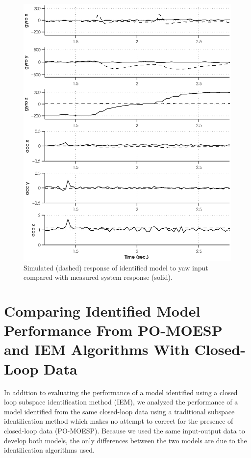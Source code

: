 \newpage
\begin{figure}[htb!]
	\centering
	\includegraphics{../fig/sim_1760_yaw.eps}
	\caption{Simulated (dashed) response of identified model to yaw input compared with measured system response (solid).}
	\label{sim_1760_yaw}
\end{figure}\clearpage


\newpage
\section{Comparing Identified Model Performance From PO-MOESP and IEM Algorithms With Closed-Loop Data}
In addition to evaluating the performance of a model identified using a closed loop subspace identification method (IEM), we analyzed the performance of a model identified from the same closed-loop data using a traditional subspace identification method which makes no attempt to correct for the presence of closed-loop data (PO-MOESP). Because we used the same input-output data to develop both models, the only differences between the two models are due to the identification algorithms used. 

